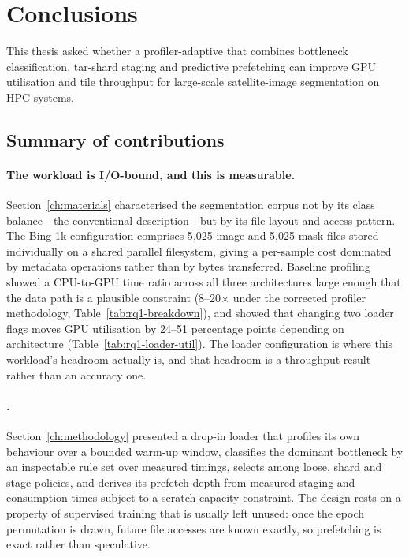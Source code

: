 \section{Conclusions}
\label{ch:conclusions}

This thesis asked whether a profiler-adaptive  that combines
bottleneck classification, tar-shard staging and predictive prefetching can improve
GPU utilisation and tile throughput for large-scale satellite-image segmentation on
HPC systems.

\subsection{Summary of contributions}

\paragraph{The workload is I/O-bound, and this is measurable.}
Section~\ref{ch:materials} characterised the segmentation corpus not by its class
balance - the conventional description - but by its file layout and access
pattern.
The Bing 1k configuration comprises 5{,}025 image and 5{,}025 mask files stored
individually on a shared parallel filesystem, giving a per-sample cost dominated by
metadata operations rather than by bytes transferred.
Baseline profiling showed a CPU-to-GPU time ratio across all three architectures
large enough that the data path is a plausible constraint (8--20$\times$ under
the corrected profiler methodology, Table~\ref{tab:rq1-breakdown}), and showed
that changing two loader flags moves GPU utilisation by 24--51 percentage points
depending on architecture (Table~\ref{tab:rq1-loader-util}).
The loader configuration is where this workload's headroom actually is, and that
headroom is a throughput result rather than an accuracy one.

\paragraph{\pads{}.}
Section~\ref{ch:methodology} presented a drop-in loader that profiles its own
behaviour over a bounded warm-up window, classifies the dominant bottleneck by an
inspectable rule set over measured timings, selects among loose, shard and stage
policies, and derives its prefetch depth from measured staging and consumption times
subject to a scratch-capacity constraint.
The design rests on a property of supervised training that is usually left unused:
once the epoch permutation is drawn, future file accesses are known exactly, so
prefetching is exact rather than speculative.

